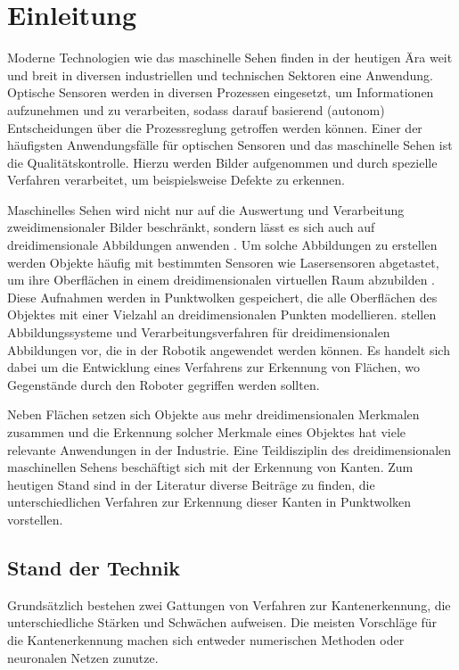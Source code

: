 \chapter{Einleitung}
Moderne Technologien wie das maschinelle Sehen finden in der heutigen Ära weit und breit in diversen industriellen und technischen Sektoren eine Anwendung. Optische Sensoren werden in diversen Prozessen eingesetzt, um Informationen aufzunehmen und zu verarbeiten, sodass darauf basierend (autonom) Entscheidungen über die Prozessreglung getroffen werden können. Einer der häufigsten Anwendungsfälle für optischen Sensoren und das maschinelle Sehen ist die Qualitätskontrolle. Hierzu werden Bilder aufgenommen und durch spezielle Verfahren verarbeitet, um beispielsweise Defekte zu erkennen. \autocite[3-11]{beyerer_machine_2015}

Maschinelles Sehen wird nicht nur auf die Auswertung und Verarbeitung zweidimensionaler Bilder beschränkt, sondern lässt es sich auch auf dreidimensionale Abbildungen anwenden \autocite{biegelbauer_model-based_2010}. Um solche Abbildungen zu erstellen werden Objekte häufig mit bestimmten Sensoren wie Lasersensoren abgetastet, um ihre Oberflächen in einem dreidimensionalen virtuellen Raum abzubilden \autocite[20-22]{savla_intelligente_2022}. Diese Aufnahmen werden in Punktwolken gespeichert, die alle Oberflächen des Objektes mit einer Vielzahl an dreidimensionalen Punkten modellieren. \Textcite{lougheed_3-d_1988} stellen Abbildungssysteme und Verarbeitungsverfahren für dreidimensionalen Abbildungen vor, die in der Robotik angewendet werden können. Es handelt sich dabei um die Entwicklung eines Verfahrens zur Erkennung von Flächen, wo Gegenstände durch den Roboter gegriffen werden sollten. 

Neben Flächen setzen sich Objekte aus mehr dreidimensionalen Merkmalen zusammen und die Erkennung solcher Merkmale eines Objektes hat viele relevante Anwendungen in der Industrie. Eine Teildisziplin des dreidimensionalen maschinellen Sehens beschäftigt sich mit der Erkennung von Kanten. Zum heutigen Stand sind in der Literatur diverse Beiträge zu finden, die unterschiedlichen Verfahren zur Erkennung dieser Kanten in Punktwolken vorstellen.

\section{Stand der Technik} \label{Stand_der_Technik}
Grundsätzlich bestehen zwei Gattungen von Verfahren zur Kantenerkennung, die unterschiedliche Stärken und Schwächen aufweisen. Die meisten Vorschläge für die Kantenerkennung machen sich entweder numerischen Methoden oder neuronalen Netzen zunutze.

